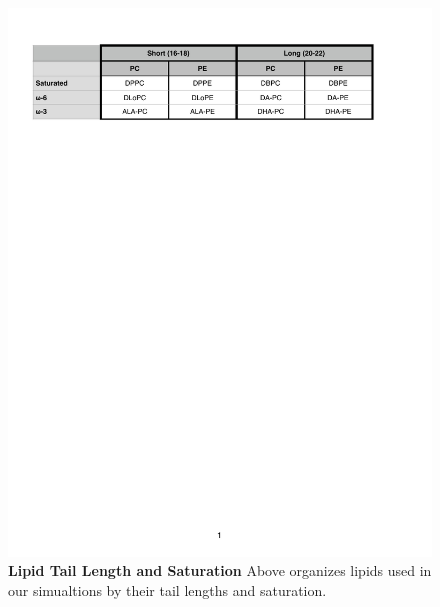 \documentclass[10pt, letterpaper]{article}
\begin{document}
\begin{figure}[H]
   \centerline{\includegraphics[width=\textwidth,scale=1]{Lipid_Table.pdf}}
   
   \caption[Lipid Tail Length and Saturation]{\textbf{Lipid Tail Length and Saturation} Above organizes lipids used in our simualtions by their tail lengths and saturation.
   }\label{fig:lchart2}

\end{figure}
   \newpage
\end{document}
